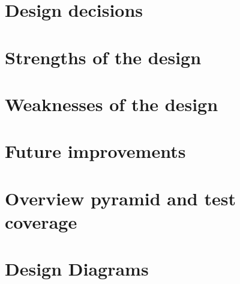 \documentclass[a4paper,12pt]{article}
\begin{document}
\setlength\parindent{0pt}



\tableofcontents

\newpage

\section{Design decisions}

\newpage

\section{Strengths of the design}

\newpage

\section{Weaknesses of the design}

\newpage

\section{Future improvements}

\newpage

\section{Overview pyramid and test coverage}

\newpage

\section{Design Diagrams}

\end{document}
